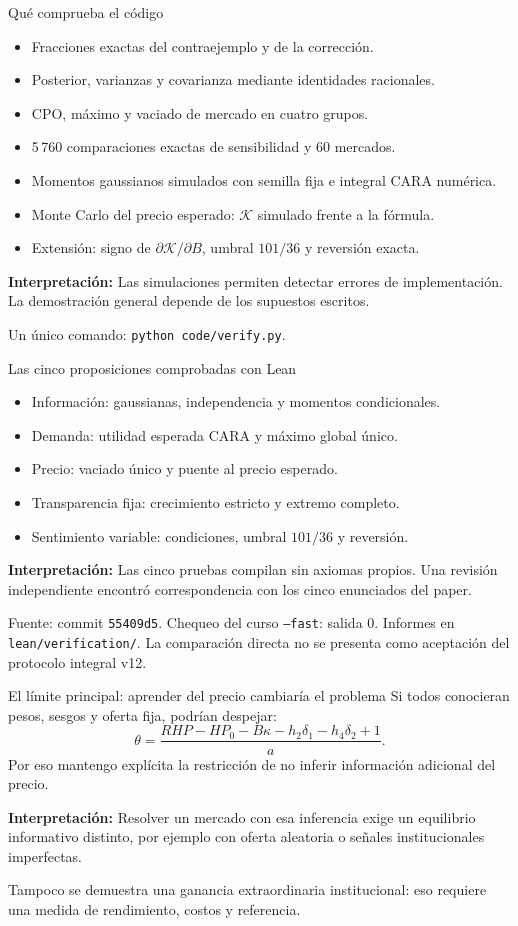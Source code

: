 \documentclass[aspectratio=169,11pt]{beamer}
\newcommand{\K}{\mathcal K}
\newcommand{\idea}[1]{\par\medskip\textbf{Interpretación:} #1}
\begin{document}
\begin{frame}{Qué comprueba el código}
\begin{itemize}
\item Fracciones exactas del contraejemplo y de la corrección.
\item Posterior, varianzas y covarianza mediante identidades racionales.
\item CPO, máximo y vaciado de mercado en cuatro grupos.
\item 5\,760 comparaciones exactas de sensibilidad y 60 mercados.
\item Momentos gaussianos simulados con semilla fija e integral CARA numérica.
\item Monte Carlo del precio esperado: \(\K\) simulado frente a la fórmula.
\item Extensión: signo de \(\partial\K/\partial B\), umbral \(101/36\) y reversión exacta.
\end{itemize}
\idea{Las simulaciones permiten detectar errores de implementación.
La demostración general depende de los supuestos escritos.}
\small\medskip\par
Un único comando: \texttt{python code/verify.py}.
\end{frame}

\begin{frame}{Las cinco proposiciones comprobadas con Lean}
\begin{itemize}
\item Información: gaussianas, independencia y momentos condicionales.
\item Demanda: utilidad esperada CARA y máximo global único.
\item Precio: vaciado único y puente al precio esperado.
\item Transparencia fija: crecimiento estricto y extremo completo.
\item Sentimiento variable: condiciones, umbral $101/36$ y reversión.
\end{itemize}
\idea{Las cinco pruebas compilan sin axiomas propios. Una revisión
independiente encontró correspondencia con los cinco enunciados del paper.}
\small\medskip\par
Fuente: commit \texttt{55409d5}. Chequeo del curso \texttt{--fast}: salida 0.
Informes en \texttt{lean/verification/}.
La comparación directa no se presenta como aceptación del protocolo integral v12.
\end{frame}

\begin{frame}{El límite principal: aprender del precio cambiaría el problema}
Si todos conocieran pesos, sesgos y oferta fija, podrían despejar:
\[
 \theta=\frac{RHP-HP_0-B\kappa-h_2\delta_1-h_4\delta_2+1}{a}.
\]
Por eso mantengo explícita la restricción de no inferir información
adicional del precio.
\idea{Resolver un mercado con esa inferencia exige un equilibrio informativo
distinto, por ejemplo con oferta aleatoria o señales institucionales imperfectas.}
\small\medskip\par
Tampoco se demuestra una ganancia extraordinaria institucional:
eso requiere una medida de rendimiento, costos y referencia.
\end{frame}
\end{document}
